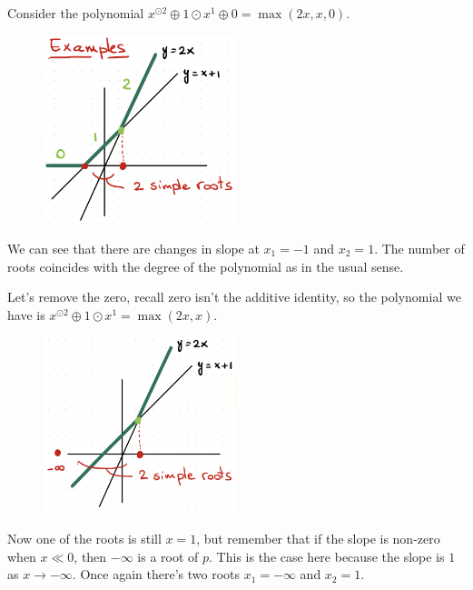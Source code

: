 \documentclass[12pt]{memoir}
\begin{document}
\begin{Ex}
    Consider the polynomial $x^{\odot2}\oplus1\odot x^1\oplus 0=\max(2x,x,0)$.
    \begin{figure}[h!]
        \centering
        \includegraphics[width=0.5\textwidth]{figs/fig3.3SimpleFiniteRootsTropicalPolynomial.png}
        \label{fig:3.3-SimpleFiniteRoots}
    \end{figure}
    We can see that there are changes in slope at $x_1=-1$ and $x_2=1$. The number of roots coincides with the degree of the polynomial as in the usual sense.
\end{Ex}

\begin{Ex}
    Let's remove the zero, recall zero isn't the additive identity, so the polynomial we have is $x^{\odot2}\oplus1\odot x^1=\max(2x,x)$.
    \begin{figure}[h!]
        \centering
        \includegraphics[width=0.5\textwidth]{figs/fig3.4SimpleRootsTropicalPolynomial.png}
        \label{fig:3.4-OneFiniteRootOneInfiniteRoot}
    \end{figure}
    Now one of the roots is still $x=1$, but remember that if the slope is non-zero when $x\ll 0$, then $-\infty$ is a root of $p$. This is the case here because the slope is $1$ as $x\to-\infty$. Once again there's two roots $x_1=-\infty$ and $x_2=1$.
\end{Ex}
\end{document}
